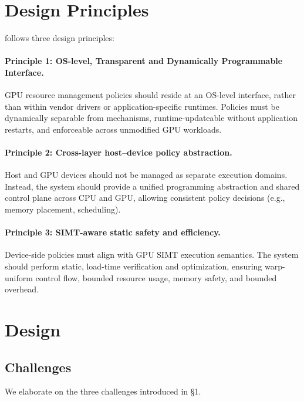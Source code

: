 \section{Design Principles}

\sys follows three design principles:

\paragraph{Principle 1: OS-level, Transparent and Dynamically Programmable Interface.}
GPU resource management policies should reside at an OS-level interface, rather than within vendor drivers or application-specific runtimes. Policies must be dynamically separable from mechanisms, runtime-updateable without application restarts, and enforceable across unmodified GPU workloads.

\paragraph{Principle 2: Cross-layer host–device policy abstraction.}
Host and GPU devices should not be managed as separate execution domains. Instead, the system should provide a unified programming abstraction and shared control plane across CPU and GPU, allowing consistent policy decisions (e.g., memory placement, scheduling).

\paragraph{Principle 3: SIMT-aware static safety and efficiency.}
Device-side policies must align with GPU SIMT execution semantics. The system should perform static, load-time verification and optimization, ensuring warp-uniform control flow, bounded resource usage, memory safety, and bounded overhead.

\section{\sys Design}

\subsection{Challenges}
\label{sec:challenges}


We elaborate on the three challenges introduced in \S1.

